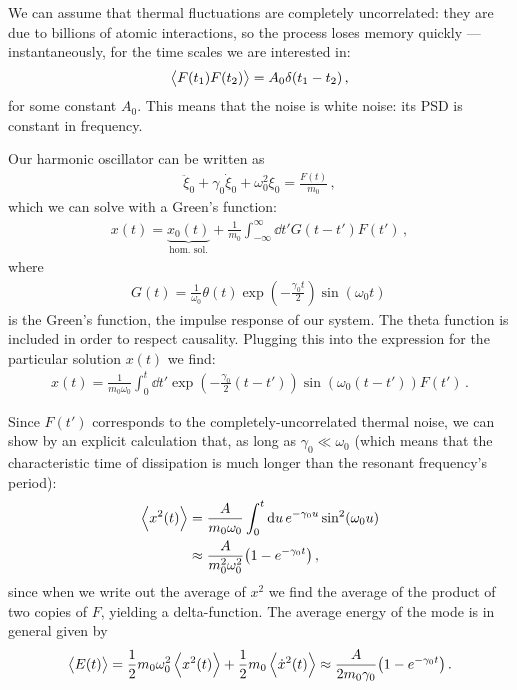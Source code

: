 \documentclass[main.tex]{subfiles}
\begin{document}
We can assume that thermal fluctuations are completely uncorrelated: they are due to billions of atomic interactions, so the process loses memory quickly --- instantaneously, for the time scales we are interested in: 
%
\begin{align}
\expval{F(t_1 ) F(t_2 )} = A_0 \delta (t_1 - t_2 )
\,,
\end{align}
%
for some constant \(A_0 \). 
This means that the noise is white noise: its PSD is constant in frequency.

Our harmonic oscillator can be written as 
%
\begin{align}
\ddot{\xi}_{0} + \gamma_0 \dot{\xi}_{0} + \omega_0^2 \xi_0 = \frac{F(t)}{m_0 }
\,,
\end{align}
%
which we can solve with a Green's function: 
%
\begin{align}
x(t) = \underbrace{x_0 (t)}_{\text{hom.\ sol.}}
+ \frac{1}{m_0 } \int_{-\infty }^{\infty } \dd{t'} G(t - t') F(t')  
\,,
\end{align}
%
where 
%
\begin{align}
G(t) = \frac{1}{\omega_0} \theta (t) \exp(- \frac{\gamma_0t}{2}) \sin(\omega_0  t)
\,
\end{align}
%
is the Green's function, the impulse response of our system. The theta function is included in order to respect causality.
Plugging this into the expression for the particular solution \(x(t)\)  we find: 
%
\begin{align}
x(t) = \frac{1}{m_0 \omega_0 } \int_{0}^{t} \dd{t'} \exp(- \frac{\gamma_0}{2} (t-t')) \sin(\omega_0 (t-t')) F(t')
\,.
\end{align}

Since \(F(t')\) corresponds to the completely-uncorrelated thermal noise, we can show by an explicit calculation that, as long as \(\gamma_0 \ll \omega_0 \) (which means that the characteristic time of dissipation is much longer than the resonant frequency's period):
%
\begin{align}
\expval{x^2(t)} &= \frac{A}{m_0 \omega_0 } \int_{0}^{t} \dd{u} e^{-\gamma_0 u} \sin^2(\omega_0 u) \\
&\approx \frac{A}{m_0^2 \omega_0^2} \qty(1 - e^{- \gamma_0 t})
\,,
\end{align}
%
since when we write out the average of \(x^2\) we find the average of the product of two copies of \(F\), yielding a delta-function.
The average energy of the mode is in general given by 
%
\begin{align}
\expval{E(t)} 
= \frac{1}{2} m_0 \omega_0^2 \expval{x^2(t)} + \frac{1}{2} m_0 \expval{\dot{x}^2(t)}
\approx \frac{A}{2 m_0 \gamma_0 } \qty(1 - e^{-\gamma_0 t})
\,.
\end{align}
\end{document}
